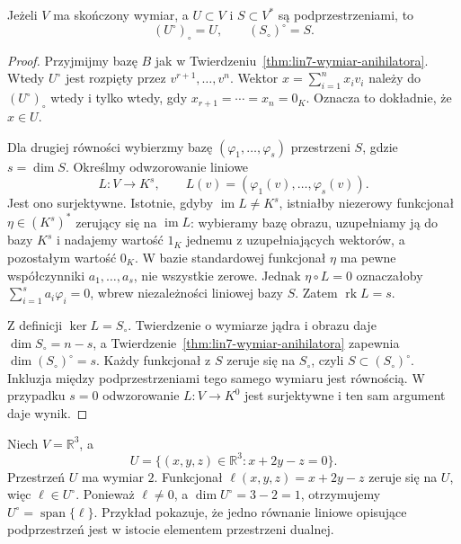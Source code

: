 \begin{wniosek}
\label{cor:lin7-podwojny-anihilator}
Jeżeli \(V\) ma skończony wymiar,
a \(U\subset V\) i \(S\subset V^*\)
są podprzestrzeniami, to
\[
 (U^\circ)_\circ=U,\qquad
 (S_\circ)^\circ=S.
\]
\end{wniosek}
\begin{proof}
Przyjmijmy bazę \(B\) jak
w Twierdzeniu~\ref{thm:lin7-wymiar-anihilatora}.
Wtedy \(U^\circ\) jest rozpięty
przez \(v^{r+1},\ldots,v^n\).
Wektor \(x=\sum_{i=1}^n x_iv_i\)
należy do \((U^\circ)_\circ\)
wtedy i tylko wtedy, gdy
\(x_{r+1}=\cdots=x_n=0_K\).
Oznacza to dokładnie, że \(x\in U\).

Dla drugiej równości wybierzmy bazę
\((\varphi_1,\ldots,\varphi_s)\)
przestrzeni \(S\), gdzie \(s=\dim S\).
Określmy odwzorowanie liniowe
\[
 L\colon V\to K^s,\qquad
 L(v)=(\varphi_1(v),\ldots,\varphi_s(v)).
\]
Jest ono surjektywne. Istotnie,
gdyby \(\operatorname{im}L\ne K^s\),
istniałby niezerowy funkcjonał
\(\eta\in(K^s)^*\) zerujący się
na \(\operatorname{im}L\):
wybieramy bazę obrazu, uzupełniamy
ją do bazy \(K^s\) i nadajemy
wartość \(1_K\) jednemu z
uzupełniających wektorów,
a pozostałym wartość \(0_K\).
W bazie standardowej funkcjonał
\(\eta\) ma pewne współczynniki
\(a_1,\ldots,a_s\), nie wszystkie zerowe.
Jednak \(\eta\circ L=0\)
oznaczałoby
\(\sum_{i=1}^s a_i\varphi_i=0\),
wbrew niezależności liniowej bazy \(S\).
Zatem \(\operatorname{rk}L=s\).

Z definicji \(\ker L=S_\circ\).
Twierdzenie o wymiarze jądra
i obrazu daje
\(\dim S_\circ=n-s\), a
Twierdzenie~\ref{thm:lin7-wymiar-anihilatora}
zapewnia
\(\dim(S_\circ)^\circ=s\).
Każdy funkcjonał z \(S\) zeruje się
na \(S_\circ\), czyli
\(S\subset(S_\circ)^\circ\).
Inkluzja między podprzestrzeniami
tego samego wymiaru jest równością.
W przypadku \(s=0\) odwzorowanie
\(L\colon V\to K^0\) jest surjektywne
i ten sam argument daje wynik.
\end{proof}

\begin{przyklad}
\label{prz:lin7-anihilator-r3}
Niech \(V=\mathbb R^3\), a
\[
 U=\{(x,y,z)\in\mathbb R^3:
                 x+2y-z=0\}.
\]
Przestrzeń \(U\) ma wymiar \(2\).
Funkcjonał \(\ell(x,y,z)=x+2y-z\)
zeruje się na \(U\), więc
\(\ell\in U^\circ\).
Ponieważ \(\ell\ne0\), a
\(\dim U^\circ=3-2=1\),
otrzymujemy
\(U^\circ=\operatorname{span}\{\ell\}\).
Przykład pokazuje, że jedno równanie
liniowe opisujące podprzestrzeń
jest w istocie elementem przestrzeni dualnej.
\end{przyklad}

